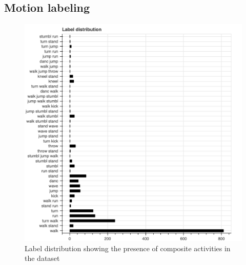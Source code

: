 		\subsection{Motion labeling}
			\begin{figure}
				\centering
				\includegraphics[width=\textwidth]{img/label-distribution.png}
				\caption{Label distribution showing the presence of composite activities in the dataset}
				\label{fig:label-distribution}
			\end{figure}
